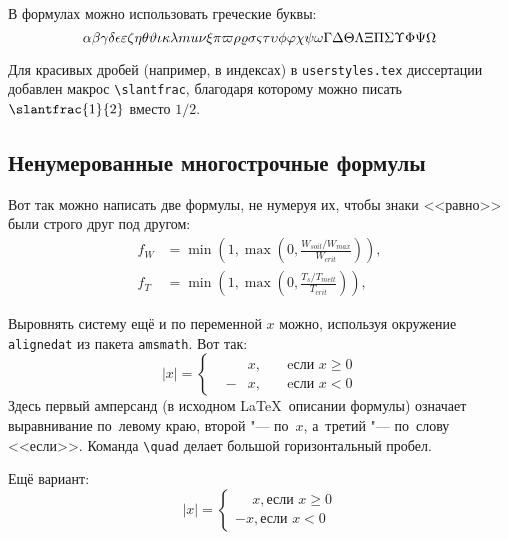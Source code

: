 В формулах можно использовать греческие буквы:
\[
\alpha\beta\gamma\delta\epsilon\varepsilon\zeta\eta\theta\vartheta\iota\kappa%
\lambda\\mu\nu\xi\pi\varpi\rho\varrho\sigma\varsigma\tau\upsilon\phi\varphi%
\chi\psi\omega\Gamma\Delta\Theta\Lambda\Xi\Pi\Sigma\Upsilon\Phi\Psi\Omega
\]

Для красивых дробей (например, в индексах) в
\verb+userstyles.tex+ диссертации добавлен макрос
\verb+\slantfrac+, благодаря которому можно
писать $\slantfrac{1}{2}$ вместо $1/2$.

\subsection{Ненумерованные многострочные формулы} \label{subsec:ch1/sec3/sub2}

Вот так можно написать две формулы, не нумеруя их, чтобы знаки <<равно>> были
строго друг под другом:
\begin{align}
  f_W & =  \min \left( 1, \max \left( 0, \frac{W_{soil} / W_{max}}{W_{crit}} \right)  \right), \nonumber \\
  f_T & =  \min \left( 1, \max \left( 0, \frac{T_s / T_{melt}}{T_{crit}} \right)  \right), \nonumber
\end{align}

Выровнять систему ещё и по переменной $ x $ можно, используя окружение
\verb|alignedat| из пакета \verb|amsmath|. Вот так:
\[
    |x| = \left\{
    \begin{alignedat}{2}
        &&x, \quad &\text{eсли } x\geqslant 0 \\
        &-&x, \quad & \text{eсли } x<0
    \end{alignedat}
    \right.
\]
Здесь первый амперсанд (в исходном \LaTeX\ описании формулы) означает
выравнивание по~левому краю, второй "--- по~$ x $, а~третий "--- по~слову
<<если>>. Команда \verb|\quad| делает большой горизонтальный пробел.

Ещё вариант:
\[
    |x|=
    \begin{cases}
    \phantom{-}x, \text{если } x \geqslant 0 \\
    -x, \text{если } x<0
    \end{cases}
\]


